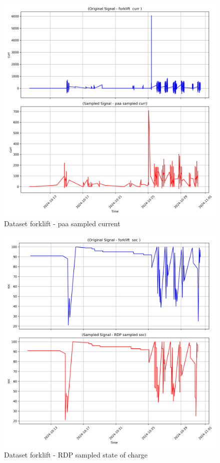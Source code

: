 \begin{figure}
    \centering
    \includegraphics[width=1\linewidth]{screenshots/forklift/paa_sampled_curr_screenshot.png}
    \caption{Dataset forklift - paa sampled current }
    \label{fig:forklift_paa_sampled_curr_screenshot}
\end{figure}
\begin{figure}
    \centering
    \includegraphics[width=1\linewidth]{screenshots/forklift/RDP_sampled_soc_screenshot.png}
    \caption{Dataset forklift - RDP sampled state of charge }
    \label{fig:forklift_RDP_sampled_soc_screenshot}
\end{figure}
